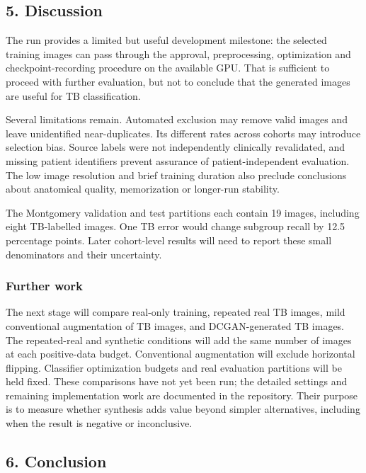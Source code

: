 \documentclass[
]{article}
\begin{document}
\subsection{5. Discussion}\label{discussion}

The run provides a limited but useful development milestone: the
selected training images can pass through the approval, preprocessing,
optimization and checkpoint-recording procedure on the available GPU.
That is sufficient to proceed with further evaluation, but not to
conclude that the generated images are useful for TB classification.

Several limitations remain. Automated exclusion may remove valid images
and leave unidentified near-duplicates. Its different rates across
cohorts may introduce selection bias. Source labels were not
independently clinically revalidated, and missing patient identifiers
prevent assurance of patient-independent evaluation. The low image
resolution and brief training duration also preclude conclusions about
anatomical quality, memorization or longer-run stability.

The Montgomery validation and test partitions each contain 19 images,
including eight TB-labelled images. One TB error would change subgroup
recall by 12.5 percentage points. Later cohort-level results will need
to report these small denominators and their uncertainty.

\subsubsection{Further work}\label{further-work}

The next stage will compare real-only training, repeated real TB images,
mild conventional augmentation of TB images, and DCGAN-generated TB
images. The repeated-real and synthetic conditions will add the same
number of images at each positive-data budget. Conventional augmentation
will exclude horizontal flipping. Classifier optimization budgets and
real evaluation partitions will be held fixed. These comparisons have
not yet been run; the detailed settings and remaining implementation
work are documented in the repository. Their purpose is to measure
whether synthesis adds value beyond simpler alternatives, including when
the result is negative or inconclusive.

\subsection{6. Conclusion}\label{conclusion}
\end{document}

